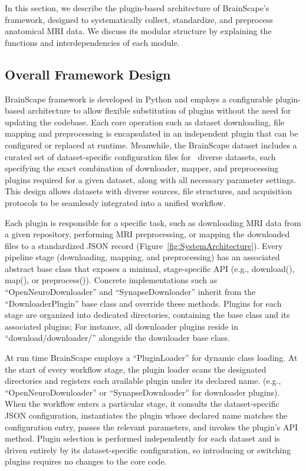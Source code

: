 In this section, we describe the plugin-based architecture of BrainScape's framework, designed to systematically 
collect, standardize, and preprocess anatomical MRI data. We discuss its modular structure by explaining 
the functions and interdependencies of each module.


\subsection{Overall Framework Design}

BrainScape framework is developed in Python and employs a configurable plugin-based architecture to allow flexible 
substitution of plugins without the need for updating the codebase. 
Each core operation such as dataset downloading, file mapping and preprocessing is encapsulated in an independent plugin that can be configured or replaced at runtime.
Meanwhile, the BrainScape dataset includes a curated set of dataset-specific configuration files for \NumDatasets\ diverse datasets, 
each specifying the exact combination of downloader, mapper, and preprocessing plugins required for a given dataset, along with all necessary parameter settings.
This design allows datasets with diverse sources, file structures, and acquisition protocols to be seamlessly integrated into a unified workflow.

Each plugin is responsible for a specific task, such as downloading MRI data from a given repository, 
performing MRI preprocessing, or mapping the downloaded files to a standardized JSON record (Figure~\ref{fig:SystemArchitecture}).
Every pipeline stage (downloading, mapping, and preprocessing) has an associated abstract base class that exposes a minimal, stage-specific API 
(e.g., download(), map(), or preprocess()).
Concrete implementations such as ``OpenNeuroDownloader'' and ``SynapseDownloader'' inherit from the ``DownloaderPlugin'' base class and override these methods. 
Plugins for each stage are organized into dedicated directories, containing the base class and its associated plugins; 
For instance, all downloader plugins reside in ``download/downloader/'' alongside the downloader base class.

At run time BrainScape employs a ``PluginLoader'' for dynamic class loading.
At the start of every workflow stage, the plugin loader scans the designated directories 
and registers each available plugin under its declared name.
(e.g., ``OpenNeuroDownloader'' or ``SynapseDownloader'' for downloader plugins).
When the workflow enters a particular stage, it consults the dataset-specific JSON configuration, 
instantiates the plugin whose declared name matches the configuration entry, passes the relevant parameters, 
and invokes the plugin's API method. 
Plugin selection is performed independently for each dataset 
and is driven entirely by its dataset-specific configuration, 
so introducing or switching plugins requires no changes to the core code.


